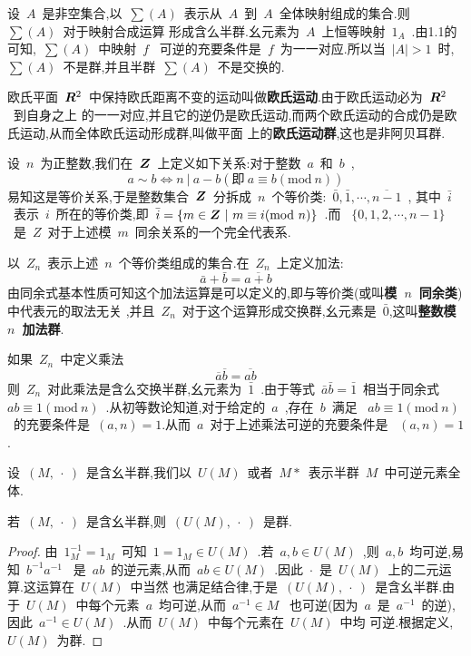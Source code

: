 \begin{example}
    设~$A$~是非空集合,以~$\sum(A)$~表示从~$A$~到~$A$~全体映射组成的集合.则~$\sum(A)$~对于映射合成运算
    形成含么半群.幺元素为~$A$~上恒等映射~$1_A$~.由1.1的可知,~$\sum(A)$~中映射~$f$~
    可逆的充要条件是~$f$~为一一对应.所以当~$|A|>1$~时,~$\sum(A)$~不是群,并且半群~$\sum(A)$~不是交换的.
\end{example}
\begin{example}
    欧氏平面~$\boldsymbol{R}^2$~中保持欧氏距离不变的运动叫做\textbf{欧氏运动}.由于欧氏运动必为~$\boldsymbol{R}^2$~到自身之上
    的一一对应,并且它的逆仍是欧氏运动,而两个欧氏运动的合成仍是欧氏运动,从而全体欧氏运动形成群,叫做平面
    上的\textbf{欧氏运动群},这也是非阿贝耳群.
\end{example}
\begin{example}
    设~$n$~为正整数,我们在~$\boldsymbol{Z}$~上定义如下关系:对于整数~$a$~和~$b$~,
    \begin{equation*}
        a \sim b \Leftrightarrow n~|~a-b(\mbox{即}~a \equiv b(\mathrm{mod}~n)) 
    \end{equation*}
    易知这是等价关系,于是整数集合~$\boldsymbol{Z}$~分拆成~$n$~个等价类:~$\bar{0},\bar{1},\cdots,\overline{n-1}$~,
    其中~$\bar{i}$~表示~$i$~所在的等价类,即~$\bar{i}=\{m \in \boldsymbol{Z}~|~m \equiv i(\mathrm{mod}~n)\}$~.而
    ~$\{0,1,2,\cdots,n-1\}$~是~$Z$~对于上述模~$m$~同余关系的一个完全代表系.\par
    以~$Z_n$~表示上述~$n$~个等价类组成的集合.在~$Z_n$~上定义加法:
    \begin{equation*}
        \bar{a}+\bar{b}=\overline{a+b}
    \end{equation*}
    由同余式基本性质可知这个加法运算是可以定义的,即与等价类(或叫\textbf{模~$n$~同余类})中代表元的取法无关
    ,并且~$Z_n$~对于这个运算形成交换群,幺元素是~$\bar{0}$,这叫\textbf{整数模~$n$~加法群}.\par
    如果~$Z_n$~中定义乘法
    \begin{equation*}
        \overline{a}\overline{b}=\overline{ab}
    \end{equation*}
    则~$Z_n$~对此乘法是含么交换半群,幺元素为~$\bar{1}$~.由于等式~$\bar{a}\bar{b}=\bar{1}$~相当于同余式
    ~$ab \equiv 1(\mathrm{mod}~n)$~.从初等数论知道,对于给定的~$a$~,存在~$b$~满足
    ~$ab \equiv 1(\mathrm{mod}~n)$~的充要条件是~$(a,n)=1$.从而~$a$~对于上述乘法可逆的充要条件是
    ~$(a,n)=1$.
\end{example}
设~$(M,~\cdot~)$~是含幺半群,我们以~$U(M)$~或者~$M*$~表示半群~$M$~中可逆元素全体.
\begin{Definition}
    若~$(M,~\cdot~)$~是含幺半群,则~$(U(M),~\cdot~)$~是群.
\end{Definition}
\begin{proof}
    由~$1_M^{-1}=1_{M}$~可知~$1=1_M \in U(M)$~.若~$a,b \in U(M)$~,则~$a,b$~均可逆,易知~$b^{-1}a^{-1}$~
    是~$ab$~的逆元素,从而~$ab \in U(M)$~.因此~$\cdot$~是~$U(M)$~上的二元运算.这运算在~$U(M)$~中当然
    也满足结合律,于是~$(U(M),~\cdot~)$~是含幺半群.由于~$U(M)$~中每个元素~$a$~均可逆,从而~$a^{-1} \in M$~
    也可逆(因为~$a$~是~$a^{-1}$~的逆),因此~$a^{-1} \in U(M)$~.从而~$U(M)$~中每个元素在~$U(M)$~中均
    可逆.根据定义,~$U(M)$~为群.
\end{proof}

